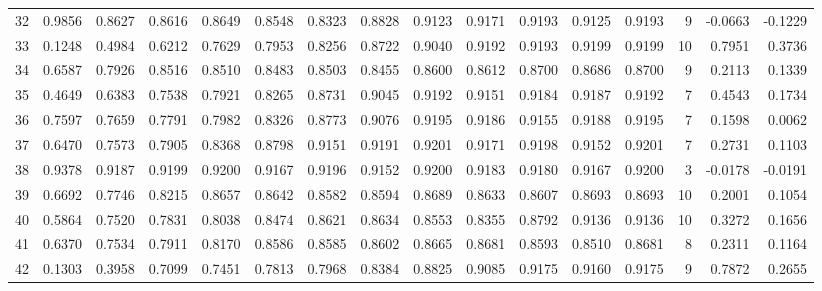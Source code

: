 \begin{tabular}{lrrrrrrrrrrrrrrr}
32  &      0.9856 &  0.8627 &  0.8616 &  0.8649 &  0.8548 &  0.8323 &  0.8828 &  0.9123 &  0.9171 &  0.9193 &   0.9125 &     0.9193 &      9 &                   -0.0663 &                    -0.1229 \\
33  &      0.1248 &  0.4984 &  0.6212 &  0.7629 &  0.7953 &  0.8256 &  0.8722 &  0.9040 &  0.9192 &  0.9193 &   0.9199 &     0.9199 &     10 &                    0.7951 &                     0.3736 \\
34  &      0.6587 &  0.7926 &  0.8516 &  0.8510 &  0.8483 &  0.8503 &  0.8455 &  0.8600 &  0.8612 &  0.8700 &   0.8686 &     0.8700 &      9 &                    0.2113 &                     0.1339 \\
35  &      0.4649 &  0.6383 &  0.7538 &  0.7921 &  0.8265 &  0.8731 &  0.9045 &  0.9192 &  0.9151 &  0.9184 &   0.9187 &     0.9192 &      7 &                    0.4543 &                     0.1734 \\
36  &      0.7597 &  0.7659 &  0.7791 &  0.7982 &  0.8326 &  0.8773 &  0.9076 &  0.9195 &  0.9186 &  0.9155 &   0.9188 &     0.9195 &      7 &                    0.1598 &                     0.0062 \\
37  &      0.6470 &  0.7573 &  0.7905 &  0.8368 &  0.8798 &  0.9151 &  0.9191 &  0.9201 &  0.9171 &  0.9198 &   0.9152 &     0.9201 &      7 &                    0.2731 &                     0.1103 \\
38  &      0.9378 &  0.9187 &  0.9199 &  0.9200 &  0.9167 &  0.9196 &  0.9152 &  0.9200 &  0.9183 &  0.9180 &   0.9167 &     0.9200 &      3 &                   -0.0178 &                    -0.0191 \\
39  &      0.6692 &  0.7746 &  0.8215 &  0.8657 &  0.8642 &  0.8582 &  0.8594 &  0.8689 &  0.8633 &  0.8607 &   0.8693 &     0.8693 &     10 &                    0.2001 &                     0.1054 \\
40  &      0.5864 &  0.7520 &  0.7831 &  0.8038 &  0.8474 &  0.8621 &  0.8634 &  0.8553 &  0.8355 &  0.8792 &   0.9136 &     0.9136 &     10 &                    0.3272 &                     0.1656 \\
41  &      0.6370 &  0.7534 &  0.7911 &  0.8170 &  0.8586 &  0.8585 &  0.8602 &  0.8665 &  0.8681 &  0.8593 &   0.8510 &     0.8681 &      8 &                    0.2311 &                     0.1164 \\
42  &      0.1303 &  0.3958 &  0.7099 &  0.7451 &  0.7813 &  0.7968 &  0.8384 &  0.8825 &  0.9085 &  0.9175 &   0.9160 &     0.9175 &      9 &                    0.7872 &                     0.2655 \\

\end{tabular}
